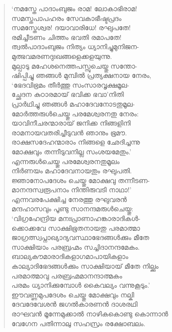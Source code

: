\begin{verse}
‘നമസ്തേ പാദാംബുജം രാമ! ലോകാഭിരാമ!\\
സമസ്തപാപഹരം സേവകാഭീഷ്ടപ്രദം\\
സമസ്തേശ്വര! ദയാവാരിധേ! രഘുപതേ!\\
രമിച്ചീടണം ചിത്തം ഭവതി രമാപതേ!\\
ത്വല്‍പാദാംബുജം നിത്യം ധ്യാനിച്ചുമുനിജന-\\
മുത്ഭവമരണദുഃഖങ്ങളെക്കളയുന്നു.\\
മുല്പാടു മഹേശനെത്തപസ്സുചെയ്തു സന്തോ-\\
ഷിപ്പിച്ചു ഞങ്ങള്‍ മുമ്പില്‍ പ്രത്യക്ഷനായ നേരം,\\
‘ഭേദവിഭ്രമം തീര്‍ത്തു സംസാരവൃക്ഷമൂല-\\
ച്ഛേദന കുഠാരമായ് ഭവിക്ക ഭവാ’നിതി\\
പ്രാര്‍ഥിച്ചു ഞങ്ങള്‍ മഹാദേവനോടതുമൂല-\\
മോര്‍ത്തരുള്‍ചെയ്തു പരമേശ്വരനതു നേരം:\\
യാവിനീചരന്മാരായ് ജനിക്ക നിങ്ങളിനി\\
രാമനായവതരിച്ചീടുവന്‍ ഞാനും ഭൂമൗ.\\
രാക്ഷസദേഹന്മാരാം നിങ്ങളെ ഛേദിച്ചന്നു\\
മോക്ഷവും തന്നീടുവനില്ല സംശയമേതും.’\\
എന്നരുള്‍ചെയ്തു പരമേശ്വരനതുമൂലം\\
നിര്‍ണയം മഹാദേവനായതും രഘുപതി.\\
ജ്ഞാനോപദേശം ചെയ്തു മോക്ഷവു തന്നീടണ-\\
മാനന്ദസ്വരൂപനാം നിന്തിരുവടി നാഥാ!’\\
എന്നവരപേക്ഷിച്ച നേരത്തു രഘുവരന്‍\\
മന്ദഹാസവും പൂണ്ടു സാനന്ദമരുള്‍ചെയ്തു:\\
‘വിഗ്രഹേന്ദ്രിയ മനഃപ്രാണാഹങ്കാരാദികള്‍-\\
ക്കൊക്കവേ സാക്ഷിഭൂതനായതു പരമാത്മാ\\
ജാഗ്രത്സ്വപ്നാഖ്യാദ്യവസ്ഥാഭേദങ്ങള്‍ക്കും മീതേ\\
സാക്ഷിയാം പരബ്രഹ്മം സച്ചിദാനന്ദമേകം.\\
ബാല്യകൗമാരാദികളാഗമാപായികളാം\\
കാല്യാദിഭേദങ്ങള്‍ക്കും സാക്ഷിയായ് മീതേ നില്ക്കും\\
പരമാത്മാവു പരബ്രഹ്മമാനന്ദാത്മകം\\
പരമം ധ്യാനിക്കുമ്പോള്‍ കൈവല്യം വന്നുകൂടും.’\\
ഈവണ്ണമുപദേശം ചെയ്തു മോക്ഷവും നല്കി\\
ദേവദേവേശന്‍ ജഗല്‍കാരണന്‍ ദാശരഥി\\
രാഘവന്‍ മൂന്നേമുക്കാല്‍ നാഴികകൊണ്ടു കൊന്നാന്‍\\
വേഗേന പതിന്നാലു സഹസ്രം രക്ഷോബലം.\\

\end{verse}
